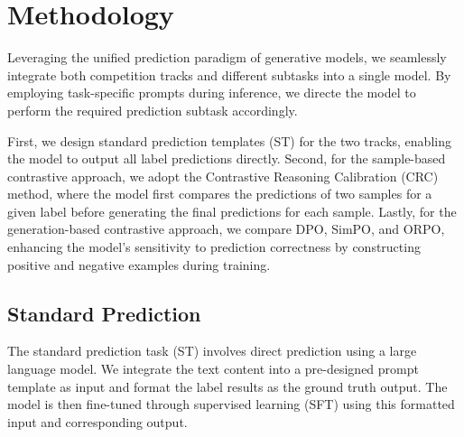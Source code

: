 \documentclass[11pt]{article}
\begin{document}
\section{Methodology}


Leveraging the unified prediction paradigm of generative models, we seamlessly integrate both competition tracks and different subtasks into a single model. By employing task-specific prompts during inference, we directe the model to perform the required prediction subtask accordingly. 

First, we design standard prediction templates (ST) for the two tracks, enabling the model to output all label predictions directly. Second, for the sample-based contrastive approach, we adopt the Contrastive Reasoning Calibration (CRC) method, where the model first compares the predictions of two samples for a given label before generating the final predictions for each sample. Lastly, for the generation-based contrastive approach, we compare DPO, SimPO, and ORPO, enhancing the model’s sensitivity to prediction correctness by constructing positive and negative examples during training.

\subsection{Standard Prediction}

The standard prediction task (ST) involves direct prediction using a large language model. We integrate the text content into a pre-designed prompt template as input and format the label results as the ground truth output. The model is then fine-tuned through supervised learning (SFT) using this formatted input and corresponding output.
\end{document}
